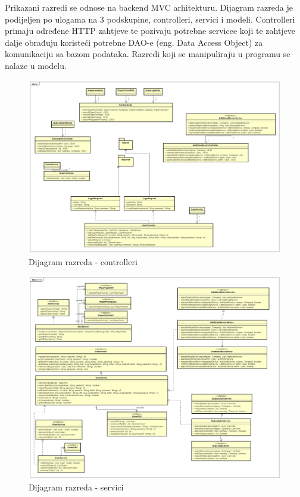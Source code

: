 			
			Prikazani razredi se odnose na backend MVC arhitekturu. Dijagram razreda je podijeljen po ulogama na 3 podskupine, controlleri, servici i modeli. Controlleri primaju određene HTTP zahtjeve te pozivaju potrebne servicee koji te zahtjeve dalje obrađuju koristeći potrebne DAO-e (eng. Data Access Object) za komunikaciju sa bazom podataka. Razredi koji se manipuliraju u programu se nalaze u modelu.
			
			\begin{figure}[H]
				\includegraphics[scale=0.33]{dijagrami/dij_raz_cont.PNG} 
				\centering
				\caption{Dijagram razreda - controlleri}
				\label{fig:dij_raz1}%
			\end{figure}
			
			\begin{figure}[H]
				\includegraphics[scale=0.34]{dijagrami/dij_raz_serv.PNG} 
				\centering
				\caption{Dijagram razreda - servici}
				\label{fig:dij_raz2}%
			\end{figure}
			

